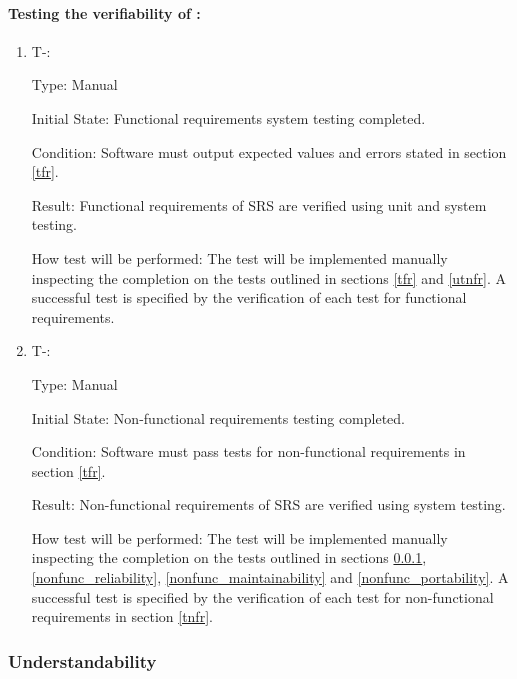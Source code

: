 \documentclass[12pt, titlepage]{article}
\newcounter{tinnum} %
\begin{document}
\paragraph{Testing the verifiability of \progname{}:}
\begin{enumerate}

\item{T-}\thetinnum\label{T-9}:

Type: Manual 
					
Initial State: Functional requirements system testing completed.
					
Condition: Software must output expected values and errors stated in section 
\ref{tfr}.
					
Result: Functional requirements of SRS are verified using unit and system testing.
					
How test will be performed: The test will be implemented manually inspecting the 
completion on the tests outlined in sections \ref{tfr} and \ref{utnfr}. A successful test is specified by the verification of each test for functional requirements.
					
\item{T-}\thetinnum\label{T-10}:

Type: Manual 
					
Initial State: Non-functional requirements testing completed.
					
Condition: Software must pass tests for non-functional requirements in section 
\ref{tfr}. 
					
Result: Non-functional requirements of SRS are verified using system testing.
					
How test will be performed: The test will be implemented manually inspecting the 
completion on the tests outlined in sections \ref{nonfunc_understability}, 
\ref{nonfunc_reliability},  \ref{nonfunc_maintainability} and 
\ref{nonfunc_portability}. A successful test is specified by the verification of each test for non-functional requirements in section \ref{tnfr}.
					

\end{enumerate}

\subsubsection{Understandability} \label{nonfunc_understability}
\end{document}
